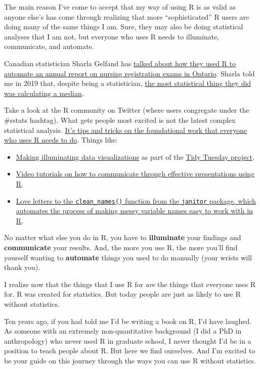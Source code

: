 \documentclass[
]{book}
\begin{document}
The main reason I've come to accept that my way of using R is as valid as anyone else's has come through realizing that more ``sophisticated'' R users are doing many of the same things I am. Sure, they may also be doing statistical analyses that I am not, but everyone who uses R needs to illuminate, communicate, and automate.

Canadian statistician Sharla Gelfand has \href{https://twitter.com/sharlagelfand/status/1135962094938009601}{talked about how they used R to automate an annual report on nursing registration exams in Ontario}. Sharla told me in 2019 that, despite being a statistician, \href{https://rfortherestofus.com/2019/09/my-r-journey-sharla-gelfand/}{the most statistical thing they did was calculating a median}.

Take a look at the R community on Twitter (where users congregate under the \#rstats hashtag). What gets people most excited is not the latest complex statistical analysis. \href{https://twitter.com/dgkeyes/status/1479473689225695234}{It's tips and tricks on the foundational work that everyone who uses R needs to do}. Things like:

\begin{itemize}
\item
  \href{https://twitter.com/CedScherer/status/1220843943224578050}{Making illuminating data visualizations} as part of the \href{https://github.com/rfordatascience/tidytuesday}{Tidy Tuesday project}.
\item
  \href{https://twitter.com/spcanelon/status/1424932510065209348}{Video tutorials on how to communicate through effective presentations using R}.
\item
  \href{https://twitter.com/WeAreRLadies/status/1228049014601342976}{Love letters to the \texttt{clean\_names()} function from the \texttt{janitor} package, which automates the process of making messy variable names easy to work with in R}.
\end{itemize}

No matter what else you do in R, you have to \textbf{illuminate} your findings and \textbf{communicate} your results. And, the more you use R, the more you'll find yourself wanting to \textbf{automate} things you used to do manually (your wrists will thank you).

I realize now that the things that I use R for \emph{are} the things that everyone uses R for. R was created for statistics. But today people are just as likely to use R without statistics.

Ten years ago, if you had told me I'd be writing a book on R, I'd have laughed. As someone with an extremely non-quantitative background (I did a PhD in anthropology) who never used R in graduate school, I never thought I'd be in a position to teach people about R. But here we find ourselves. And I'm excited to be your guide on this journey through the ways you can use R without statistics.
\end{document}
